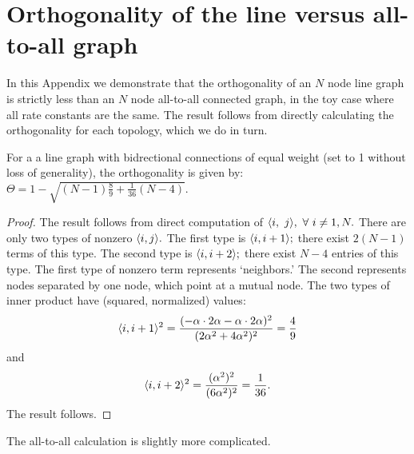 \section{Orthogonality of the line versus all-to-all graph}
\label{app:line_v_all}
In this Appendix we demonstrate that the orthogonality of an $N$ node line graph is strictly less than an $N$ node all-to-all connected graph, in the toy case where all rate constants are the same.  The result follows from directly calculating the orthogonality for each topology, which we do in turn.

\begin{prop}{For a a line graph with bidrectional connections of equal weight (set to 1 without loss of generality), the orthogonality is given by: $\Theta  = 1 - \sqrt{(N-1)\frac{8}{9}+\frac{1}{36}(N-4)}$. 
}
\end{prop}
\begin{proof}
The result follows from direct computation of $\langle i, \ j\rangle, \ \forall \  i\neq 1,N.$
There are only two types of nonzero $\langle i,j \rangle.$  The first type is $\langle i, i+1 \rangle;$ there exist $2(N-1)$ terms of this type.  The second type is $\langle i,i+2 \rangle;$ there exist $N-4$ entries of this type.  The first type of nonzero term represents `neighbors.'  The second represents nodes separated by one node, which point at a mutual node.  The two types of inner product have (squared, normalized) values:
\[
\langle i, i+1 \rangle^2 = \frac{(-\alpha\cdot2\alpha-\alpha\cdot 2\alpha)^2}{(2\alpha^2+4\alpha^2)^2} = \frac{4}{9}
\]
and
\[
\langle i, i+2 \rangle^2 = \frac{(\alpha^2)^2}{(6\alpha^2)^2} = \frac{1}{36}.
\]
The result follows.
\end{proof}

The all-to-all calculation is slightly more complicated.

